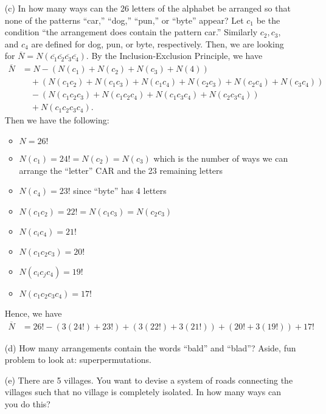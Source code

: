 \documentclass[11pt]{article}
\begin{document}
\begin{enumerate}
        \item[(c)] In how many ways can the 26 letters of the alphabet be arranged so that none of the patterns ``car,'' ``dog,'' ``pun,'' or ``byte'' appear? Let \(c_1\) be the condition ``the arrangement does contain the pattern car.'' Similarly \(c_2, c_3,\) and \(c_4\) are defined for dog, pun, or byte, respectively. Then, we are looking for \(\overline{N} = N(\overline{c_1} \overline{c_2} \overline{c_3} \overline{c_4})\). By the Inclusion-Exclusion Principle, we have 
        \begin{align*}
            \overline{N} &= N - (N(c_1) + N(c_2) + N(c_3) + N(4)) \\
                         & \quad + (N(c_1 c_2) + N(c_1 c_3) + N(c_1 c_4) + N(c_2 c_3) + N(c_2 c_4) + N(c_3 c_4)) \\
                         & \quad - (N(c_1 c_2 c_3) + N(c_1 c_2 c_4) + N(c_1 c_3 c_4) + N(c_2 c_3 c_4)) \\
                         & \quad + N(c_1 c_2 c_3 c_4).
        \end{align*} 
        Then we have the following:
        \begin{itemize}
            \item \(N = 26!\)
            \item \(N(c_1) = 24! = N(c_2) = N(c_3)\) which is the number of ways we can arrange the ``letter'' CAR and the 23 remaining letters
            \item \(N(c_4) = 23!\) since ``byte'' has 4 letters
            \item \(N(c_1 c_2) = 22! = N(c_1 c_3) = N(c_2 c_3)\)
            \item \(N(c_i c_4) = 21!\)
            \item \(N(c_1 c_2 c_3) = 20!\)
            \item \(N(c_i c_j c_4) = 19!\)
            \item \(N(c_1 c_2 c_3 c_4) = 17!\)
        \end{itemize}
        Hence, we have 
        \begin{align*}
            \overline{N} &= 26! - (3(24!) + 23!) + (3(22!) + 3(21!)) + (20! + 3(19!)) + 17!
        \end{align*}

        \item[(d)] How many arrangements contain the words ``bald'' and ``blad''? Aside, fun problem to look at: superpermutations.
        
        \item[(e)] There are 5 villages. You want to devise a system of roads connecting the villages such that no village is completely isolated. In how many ways can you do this?
        

\end{enumerate}
\end{document}
